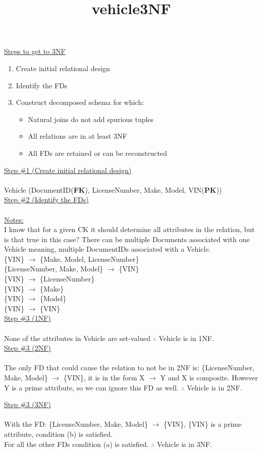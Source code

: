 \documentclass[12pt]{article}   %
\title{vehicle3NF}
\begin{document}
\underline{Steps to get to 3NF}
\begin{enumerate}
    \item Create initial relational design
    \item Identify the FDs
    \item Construct decomposed schema for which:
          \begin{itemize}
              \item Natural joins do not add spurious tuples
              \item All relations are in at least 3NF
              \item All FDs are retained or can be reconstructed
          \end{itemize}
\end{enumerate}

\underline{Step \#1 (Create initial relational design)}\\
\\
Vehicle (DocumentID(\textbf{FK}), LicenseNumber, Make, Model, VIN(\textbf{PK}))\\

\underline{Step \#2 (Identify the FDs)}\\
\\
\underline{Notes:}\\
I know that for a given CK it should determine all attributes in the relation, but is that true in this case? There can be multiple Documents associated with one Vehicle meaning, multiple DocumentIDs associated with a Vehicle.\\

\{VIN\} $\longrightarrow$ \{Make, Model, LicenseNumber\}\\
\{LicenseNumber, Make, Model\} $\longrightarrow$ \{VIN\}\\
\{VIN\} $\longrightarrow$ \{LicenseNumber\}\\
\{VIN\} $\longrightarrow$ \{Make\}\\
\{VIN\} $\longrightarrow$ \{Model\}\\
\{VIN\} $\longrightarrow$ \{VIN\}\\

\underline{Step \#3 (1NF)}\\
\\
None of the attributes in Vehicle are set-valued $\therefore$ Vehicle is in 1NF.\\

\underline{Step \#3 (2NF)}\\
\\
The only FD that could cause the relation to not be in 2NF is: \{LicenseNumber, Make, Model\} $\longrightarrow$ \{VIN\}, it is in the form X $\longrightarrow$ Y and X is composite. However Y is a prime attribute, so we can ignore this FD as well. $\therefore$ Vehicle is in 2NF.\\
\newpage

\underline{Step \#3 (3NF)}\\
\\
With the FD: \{LicenseNumber, Make, Model\} $\longrightarrow$ \{VIN\}, \{VIN\} is a prime attribute, condition (b) is satisfied.\\

For all the other FDs condition (a) is satisfied. $\therefore$ Vehicle is in 3NF.
\end{document}
